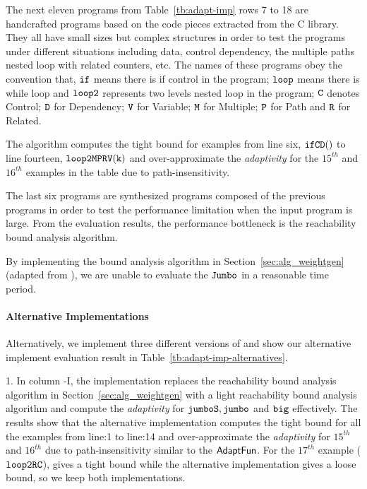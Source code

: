 The next eleven programs from Table~\ref{tb:adapt-imp} rows 7 to 18 are handcrafted programs based on the code pieces extracted from the C library. They all have small sizes but complex structures in order to test the programs under different situations including
data, control dependency,
the multiple paths nested loop with related counters, etc.
The names of these programs obey the convention that,
$\mathtt{if}$ means there is if control in the program;
$\mathtt{loop}$ means there is while loop and $\mathtt{loop2}$ represents two levels nested loop in the program;
$\mathtt{C}$ denotes Control;
$\mathtt{D}$ for Dependency; $\mathtt{V}$ for Variable;
$\mathtt{M}$ for Multiple; $\mathtt{P}$ for Path and $\mathtt{R}$ for Related.


The algorithm computes the tight bound for examples from line six, $\mathtt{ifCD()}$ to line fourteen, $\mathtt{loop2MPRV(k)}$
and over-approximate the \emph{adaptivity} for the $15^{th}$ and $16^{th}$ examples in the table due to path-insensitivity.

The last six programs are synthesized programs composed of the previous programs in order to test the performance limitation when the input program is large. 
From the evaluation results, the performance bottleneck is the reachability bound analysis algorithm.


By implementing the bound analysis algorithm in Section~\ref{sec:alg_weightgen} (adapted from \cite{SinnZV17}), we are unable to evaluate the $\mathtt{Jumbo}$ in a reasonable time period.

\paragraph{Alternative Implementations}
Alternatively, we implement three different versions of {\THESYSTEM} and show our alternative implement evaluation result in Table~\ref{tb:adapt-imp-alternatives}.
 
1. In column {\THESYSTEM}-I, the implementation replaces the reachability bound analysis algorithm in Section~\ref{sec:alg_weightgen} with a light reachability bound analysis algorithm and compute the \emph{adaptivity} for
$\mathtt{jumboS}, \mathtt{jumbo}$ and $\mathtt{big}$ effectively.
The results show that the alternative implementation computes the tight bound for all the examples from line:1 to line:14
and over-approximate the \emph{adaptivity} for $15^{th}$ and $16^{th}$ due to path-insensitivity similar to the
$\textsf{AdaptFun}$.
For the $17^{th}$ example ($\mathtt{loop2RC}$), {\THESYSTEM} gives a tight bound while the alternative implementation gives a loose bound, so we keep both implementations.

